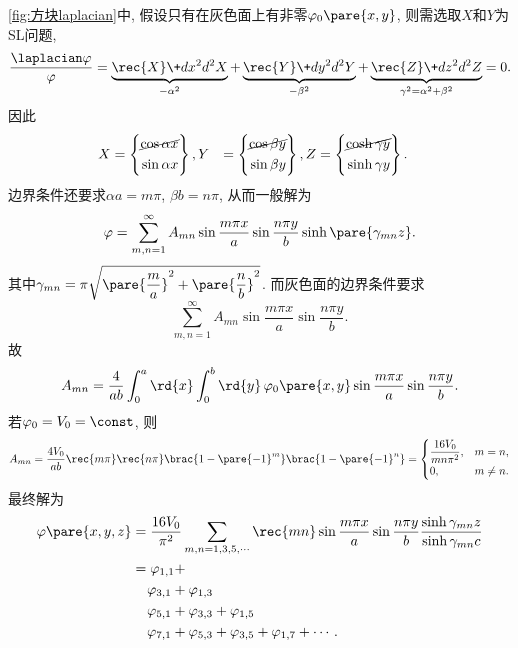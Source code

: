 \documentclass[hidelinks]{ctexart}
\begin{document}
\begin{sample}
    \begin{ex}
        \cref{fig:方块laplacian}中, 假设只有在灰色面上有非零$\varphi_0\pare{x,y}$, 则需选取$X$和$Y$为SL问题,
        \[ \frac{\laplacian\varphi}{\varphi} = \underbrace{\rec{X}\+d{x^2}d{^2X}}_{-\alpha^2} + \underbrace{\rec{Y}\+d{y^2}d{^2Y}}_{-\beta^2} + \underbrace{\rec{Z}\+d{z^2}d{^2Z}}_{\gamma^2 = \alpha^2 + \beta^2} = 0. \]
        因此
        \begin{align*}
            X &= \left\{\begin{aligned}
                \cancel{\cos \alpha x} \\ \sin \alpha x
                \end{aligned} \right\},
            Y &= \left\{\begin{aligned}
                \cancel{\cos \beta y} \\ \sin \beta y
                \end{aligned} \right\},
            Z &= \left\{\begin{aligned}
                \cancel{\cosh \gamma y} \\ \sinh \gamma y
                \end{aligned} \right\}.
        \end{align*}
        边界条件还要求$\alpha a = m\pi$, $\beta b = n\pi$, 从而一般解为
        \[ \varphi = \sum_{m,n=1}^\infty A_{mn}\sin\frac{m\pi x}{a} \sin \frac{n\pi y}{b} \sinh \pare{\gamma_{mn}z}. \]
        其中$\displaystyle \gamma_{mn} = \pi \sqrt{\pare{\frac{m}{a}}^2 + \pare{\frac{n}{b}}^2}$. 而灰色面的边界条件要求
        \[ \sum_{m,n=1}^\infty A_{mn}\sin\frac{m\pi x}{a}\sin\frac{n\pi y}{b}. \]
        故
        \[ A_{mn} = \frac{4}{ab} \int_0^a \rd{x} \int_0^b\rd{y} \,\varphi_0\pare{x,y} \sin \frac{m\pi x}{a} \sin \frac{n\pi y}{b}. \]
        若$\varphi_0 = V_0 = \const$, 则
        \[ A_{mn}  = \frac{4V_0}{ab}\rec{m\pi}\rec{n\pi}\brac{1-\pare{-1}^m}\brac{1-\pare{-1}^n} = \begin{cases}
            \displaystyle \frac{16V_0}{mn\pi^2}, & m=n,\\
            0, & m\neq n.
        \end{cases} \]
        最终解为
        \begin{align*}
            \varphi\pare{x,y,z} &= \frac{16V_0}{\pi^2} \sum_{m,n=1,3,5,\cdots} \rec{mn}\sin \frac{m\pi x}{a}\sin\frac{n\pi y}{b} \frac{\sinh \gamma_{mn}z}{\sinh \gamma_{mn}c} \\
            &= \varphi_{1,1} + \\
            &\phantom{=\ } \varphi_{3,1} + \varphi_{1,3} \\
            &\phantom{=\ } \varphi_{5,1} + \varphi_{3,3} + \varphi_{1,5} \\
            &\phantom{=\ } \varphi_{7,1} + \varphi_{5,3} + \varphi_{3,5} + \varphi_{1,7}+\cdots.
        \end{align*}
    \end{ex}
\end{sample}
\end{document}
